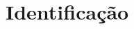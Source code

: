 \documentclass[12pt,a4paper]{article}
\begin{document}



\newpage%
\section{Identificação}



\newpage%





\end{document}
